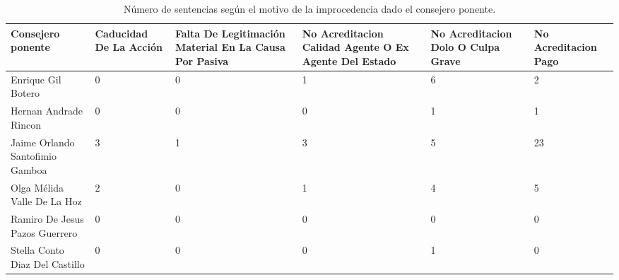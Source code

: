 \begin{sidewaystable}[!htbp]
\centering
\caption{Número de sentencias según el motivo de la improcedencia dado el consejero ponente.} 
\label{tab:consejeroimpro}
\begin{tabular}{lR{3cm}R{3cm}R{3cm}R{3cm}R{3cm}}
  \hline
Consejero ponente & Caducidad De La Acción & Falta De Legitimación Material En La Causa Por Pasiva & No Acreditacion Calidad Agente O Ex Agente Del Estado & No Acreditacion Dolo O Culpa Grave & No Acreditacion Pago \\ 
  \hline
Enrique Gil Botero &  0 &  0 &  1 &  6 &  2 \\ 
  Hernan Andrade Rincon &  0 &  0 &  0 &  1 &  1 \\ 
  Jaime Orlando Santofimio Gamboa &  3 &  1 &  3 &  5 & 23 \\ 
  Olga Mélida Valle De La Hoz &  2 &  0 &  1 &  4 &  5 \\ 
  Ramiro De Jesus Pazos Guerrero &  0 &  0 &  0 &  0 &  0 \\ 
  Stella Conto Diaz Del Castillo &  0 &  0 &  0 &  1 &  0 \\ 
   \hline
\end{tabular}
\end{sidewaystable}
